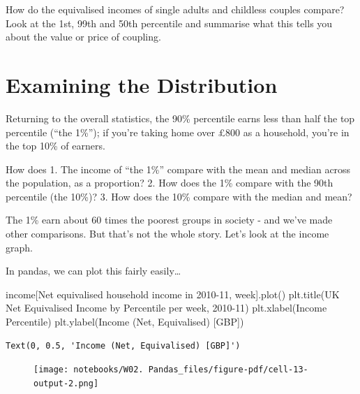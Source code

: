 \documentclass[
  letterpaper,
  DIV=11,
  numbers=noendperiod]{scrreprt}
\newenvironment{Shaded}{\begin{snugshade}}{\end{snugshade}}
\newcommand{\NormalTok}[1]{\textcolor[rgb]{0.00,0.23,0.31}{#1}}
\newcommand{\StringTok}[1]{\textcolor[rgb]{0.13,0.47,0.30}{#1}}
\begin{document}
How do the equivalised incomes of single adults and childless couples
compare? Look at the 1st, 99th and 50th percentile and summarise what
this tells you about the value or price of coupling.

\hypertarget{examining-the-distribution}{%
\section{Examining the Distribution}\label{examining-the-distribution}}

Returning to the overall statistics, the 90\% percentile earns less than
half the top percentile (``the 1\%''); if you're taking home over £800
as a household, you're in the top 10\% of earners.

How does 1. The income of ``the 1\%'' compare with the mean and median
across the population, as a proportion? 2. How does the 1\% compare with
the 90th percentile (the 10\%)? 3. How does the 10\% compare with the
median and mean?

The 1\% earn about 60 times the poorest groups in society - and we've
made other comparisons. But that's not the whole story. Let's look at
the income graph.

In pandas, we can plot this fairly easily\ldots{}

\begin{Shaded}
\begin{Highlighting}[]
\NormalTok{income[}\StringTok{\textquotesingle{}Net equivalised household income in 2010{-}11, week\textquotesingle{}}\NormalTok{].plot()}
\NormalTok{plt.title(}\StringTok{\textquotesingle{}UK Net Equivalised Income by Percentile per week, 2010{-}11\textquotesingle{}}\NormalTok{)}
\NormalTok{plt.xlabel(}\StringTok{\textquotesingle{}Income Percentile\textquotesingle{}}\NormalTok{)}
\NormalTok{plt.ylabel(}\StringTok{\textquotesingle{}Income (Net, Equivalised) [GBP]\textquotesingle{}}\NormalTok{)}
\end{Highlighting}
\end{Shaded}

\begin{verbatim}
Text(0, 0.5, 'Income (Net, Equivalised) [GBP]')
\end{verbatim}

\begin{figure}[H]

{\centering \texttt{[image: notebooks/W02. Pandas\_files/figure-pdf/cell-13-output-2.png]}

}

\end{figure}
\end{document}
